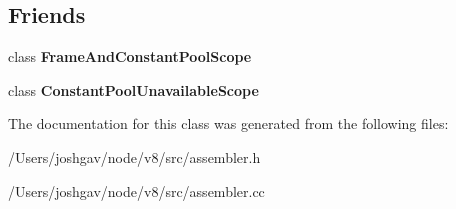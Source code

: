 \subsection*{Friends}
\begin{DoxyCompactItemize}
\item 
class {\bfseries Frame\+And\+Constant\+Pool\+Scope}\hypertarget{classv8_1_1internal_1_1_assembler_base_aa304fe9349eea268e71b1a8e1287d56e}{}\label{classv8_1_1internal_1_1_assembler_base_aa304fe9349eea268e71b1a8e1287d56e}

\item 
class {\bfseries Constant\+Pool\+Unavailable\+Scope}\hypertarget{classv8_1_1internal_1_1_assembler_base_a6eeae7aab06d03635ae81dd285ddd428}{}\label{classv8_1_1internal_1_1_assembler_base_a6eeae7aab06d03635ae81dd285ddd428}

\end{DoxyCompactItemize}


The documentation for this class was generated from the following files\+:\begin{DoxyCompactItemize}
\item 
/\+Users/joshgav/node/v8/src/assembler.\+h\item 
/\+Users/joshgav/node/v8/src/assembler.\+cc\end{DoxyCompactItemize}
